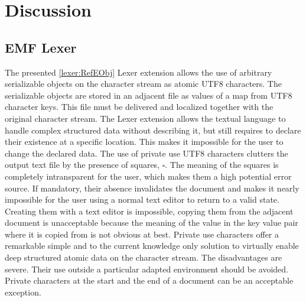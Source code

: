 \chapter{Discussion} \label{cha:discussion}
%
\section{EMF Lexer} The presented \ref{lexer:RefEObj} Lexer extension allows the use of arbitrary serializable objects on the character stream as atomic UTF8 characters. The serializable objects are stored in an adjacent file as values of a map from UTF8 character keys. This file must be delivered and localized together with the original character stream. The Lexer extension allows the textual language to handle complex structured data without describing it, but still requires to declare their existence at a specific location. This makes it impossible for the user to change the declared data. The use of private use UTF8 characters clutters the output text file by the presence of squares, $\square$. The meaning of the squares is completely intransparent for the user, which makes them a high potential error source. If mandatory, their absence invalidates the document and makes it nearly impossible for the user using a normal text editor to return to a valid state. Creating them with a text editor is impossible, copying them from the adjacent document is unacceptable because the meaning of the value in the key value pair where it is copied from is not obvious at best. Private use characters offer a remarkable simple and to the current knowledge only solution to virtually enable deep structured atomic data on the character stream. The disadvantages are severe. Their use outside a particular adapted environment should be avoided. Private characters at the start and the end of a document can be an acceptable exception. 


